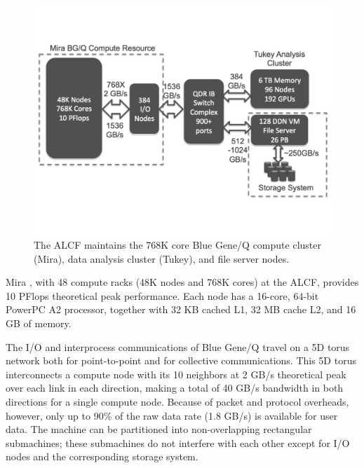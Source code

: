 \documentclass[final,5p,times]{elsarticle}
\begin{document}
\begin{figure}[!htb]
\vspace{-0.1in}
\centering
\includegraphics[scale=0.3]{anl_facility.pdf}
\vspace{-0.1in}
\caption{The ALCF maintains the 768K core Blue Gene/Q compute cluster (Mira), data analysis cluster (Tukey), and file server nodes.}
\vspace{-0.1in}
\label{fig:alcf}
\end{figure}


Mira \cite{Chen:BGQ}, with 48 compute racks (48K nodes and 768K cores) at the ALCF, provides 10 PFlops theoretical peak performance. Each node has a 16-core, 64-bit PowerPC A2 processor, together with 32 KB cached L1, 32 MB cache L2, and 16 GB of memory.

The I/O and interprocess communications of Blue Gene/Q travel on a 5D torus network both for point-to-point and for collective communications. This 5D torus interconnects a compute node with its 10 neighbors at 2 GB/s theoretical peak over each link in each direction, making a total of 40 GB/s bandwidth in both directions for a single compute node. Because of packet and protocol overheads, however, only up to 90\% of the raw data rate (1.8 GB/s) is available for user data. The machine can be partitioned into non-overlapping rectangular submachines; these submachines do not interfere with each other except for I/O nodes and the corresponding storage system.
\end{document}
